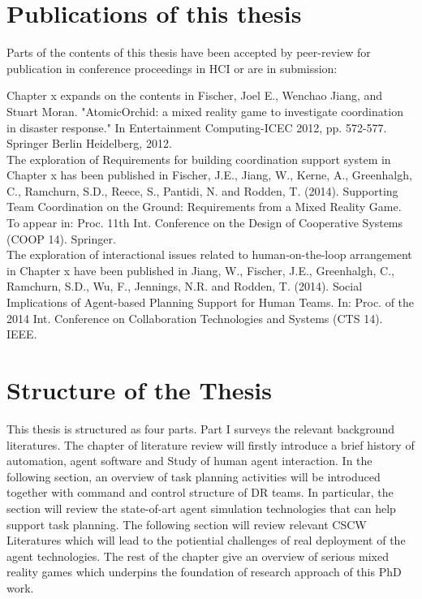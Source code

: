 \section{Publications of this thesis} 
Parts of the contents of this thesis have been accepted by peer-review for publication in conference proceedings in HCI or are in submission:

Chapter x expands on the contents in Fischer, Joel E., Wenchao Jiang, and Stuart Moran. "AtomicOrchid: a mixed reality game to investigate coordination in disaster response." In Entertainment Computing-ICEC 2012, pp. 572-577. Springer Berlin Heidelberg, 2012.\\

The exploration of Requirements for building coordination support system in Chapter x has been published in Fischer, J.E., Jiang, W., Kerne, A., Greenhalgh, C., Ramchurn, S.D., Reece, S., Pantidi, N. and Rodden, T. (2014). Supporting Team Coordination on the Ground: Requirements from a Mixed Reality Game. To appear in: Proc. 11th Int. Conference on the Design of Cooperative Systems (COOP 14). Springer.\\

The exploration of interactional issues related to human-on-the-loop arrangement in Chapter x have been published in Jiang, W., Fischer, J.E., Greenhalgh, C., Ramchurn, S.D., Wu, F., Jennings, N.R. and Rodden, T. (2014). Social Implications of Agent-based Planning Support for Human Teams.  In: Proc. of the 2014 Int. Conference on Collaboration Technologies and Systems (CTS 14). IEEE.\\







\section{Structure of the Thesis}
This thesis is structured as four parts. Part I surveys the relevant background literatures. The chapter of literature review will firstly introduce a brief history of automation, agent software and Study of human agent interaction. In the following section, an overview of task planning activities will be introduced together with command and control structure of DR teams. In particular, the section will review the state-of-art agent simulation technologies that can help support task planning. The following section will review relevant CSCW Literatures which will lead to the potiential challenges of real deployment of the agent technologies. The rest of the chapter give an overview of serious mixed reality games which underpins the foundation of research approach of this PhD work.\\

